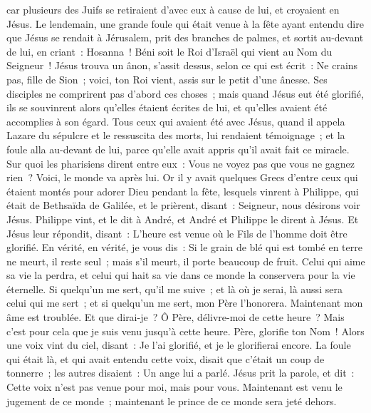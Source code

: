 \begin{multicols}{2}
car plusieurs des Juifs se retiraient d'avec eux à cause de lui, et croyaient en Jésus.
Le lendemain, une grande foule qui était venue à la fête ayant entendu dire que Jésus se rendait à Jérusalem,
prit des branches de palmes, et sortit au-devant de lui, en criant~: Hosanna~! Béni soit le Roi d'Israël qui vient au Nom du Seigneur~!
Jésus trouva un ânon, s'assit dessus, selon ce qui est écrit~:
Ne crains pas, fille de Sion~; voici, ton Roi vient, assis sur le petit d'une ânesse.
Ses disciples ne comprirent pas d'abord ces choses~; mais quand Jésus eut été glorifié, ils se souvinrent alors qu'elles étaient écrites de lui, et qu'elles avaient été accomplies à son égard.
Tous ceux qui avaient été avec Jésus, quand il appela Lazare du sépulcre et le ressuscita des morts, lui rendaient témoignage~;
et la foule alla au-devant de lui, parce qu'elle avait appris qu'il avait fait ce miracle.
Sur quoi les pharisiens dirent entre eux~: Vous ne voyez pas que vous ne gagnez rien~? Voici, le monde va après lui.
Or il y avait quelques Grecs d'entre ceux qui étaient montés pour adorer Dieu pendant la fête,
lesquels vinrent à Philippe, qui était de Bethsaïda de Galilée, et le prièrent, disant~: Seigneur, nous désirons voir Jésus.
Philippe vint, et le dit à André, et André et Philippe le dirent à Jésus.
Et Jésus leur répondit, disant~: L'heure est venue où le Fils de l'homme doit être glorifié.
En vérité, en vérité, je vous dis~: Si le grain de blé qui est tombé en terre ne meurt, il reste seul~; mais s'il meurt, il porte beaucoup de fruit.
Celui qui aime sa vie la perdra, et celui qui hait sa vie dans ce monde la conservera pour la vie éternelle.
Si quelqu'un me sert, qu'il me suive~; et là où je serai, là aussi sera celui qui me sert~; et si quelqu'un me sert, mon Père l'honorera.
Maintenant mon âme est troublée. Et que dirai-je~? Ô Père, délivre-moi de cette heure~? Mais c'est pour cela que je suis venu jusqu'à cette heure.
Père, glorifie ton Nom~! Alors une voix vint du ciel, disant~: Je l'ai glorifié, et je le glorifierai encore.
La foule qui était là, et qui avait entendu cette voix, disait que c'était un coup de tonnerre~; les autres disaient~: Un ange lui a parlé.
Jésus prit la parole, et dit~: Cette voix n'est pas venue pour moi, mais pour vous.
Maintenant est venu le jugement de ce monde~; maintenant le prince de ce monde sera jeté dehors.

\end{multicols}
